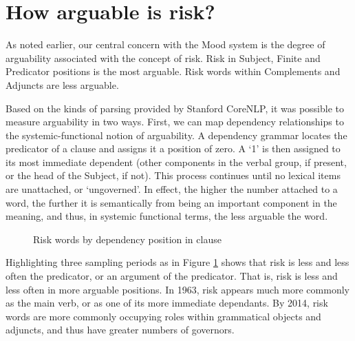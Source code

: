 	\section{How arguable is risk?} \label{sect:arguability}
	\FloatBarrier

		As noted earlier, our central concern with the Mood system is the degree of arguability associated with the concept of risk. Risk in Subject, Finite and Predicator positions is the most arguable. Risk words within Complements and Adjuncts are less arguable.


		Based on the kinds of parsing provided by Stanford CoreNLP, it was possible to measure arguability in two ways. First, we can map dependency relationships to the systemic-functional notion of arguability. A dependency grammar locates the predicator of a clause and assigns it a position of zero. A `1' is then assigned to its most immediate dependent (other components in the verbal group, if present, or the head of the Subject, if not). This process continues until no lexical items are unattached, or `ungoverned'. In effect, the higher the number attached to a word, the further it is semantically from being an important component in the meaning, and thus, in systemic functional terms, the less arguable the word.

			\begin{figure}[htb!]
			\centering
			\caption{Risk words by dependency position in clause}
			\label{fig:depnum}
			\end{figure}
			Highlighting three sampling periods as in Figure \ref{fig:depnum} shows that risk is less and less often the predicator, or an argument of the predicator. That is, risk is less and less often in more arguable positions. In 1963, risk appears much more commonly as the main verb, or as one of its more immediate dependants. By 2014, risk words are more commonly occupying roles within grammatical objects and adjuncts, and thus have greater numbers of governors.%

